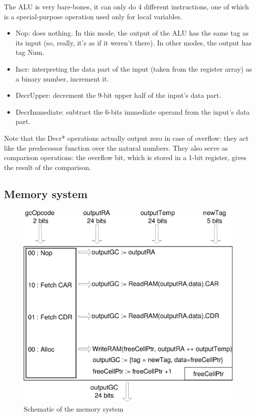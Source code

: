 \documentclass[a4paper, 11pt]{article}
\begin{document}
The ALU is very bare-bones, it can only do 4 different instructions, one of which is a special-purpose operation used only for local variables.
\begin{itemize}
\item Nop: does nothing. In this mode, the output of the ALU has the same tag as its input (so, really, it's as if it weren't there). In other modes, the output has tag Num.
\item Incr: interpreting the data part of the input (taken from the register array) as a binary number, increment it.
\item DecrUpper: decrement the 9-bit upper half of the input's data part.
\item DecrImmediate: subtract the 6-bits immediate operand from the input's data part.
\end{itemize}
Note that the Decr* operations actually output zero in case of overflow: they act like the predecessor function over the natural numbers. They also serve as comparison operations: the overflow bit, which is stored in a 1-bit register, gives the result of the comparison.

\newpage
\subsection{Memory system}

\begin{figure}[h]
\center
\caption{Schematic of the memory system}
   \includegraphics[scale=0.5]{GC.eps}
\end{figure}
\end{document}
